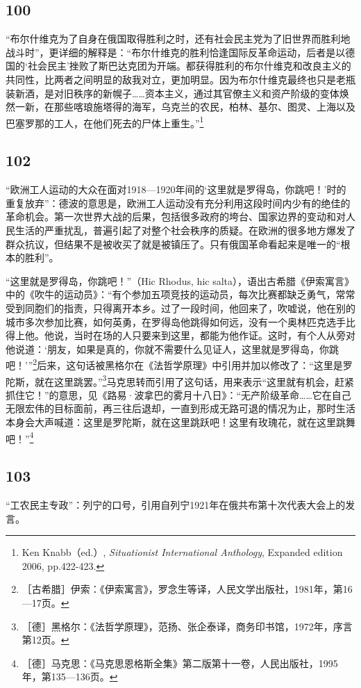\documentclass[fontset=fandol, a4paper, 12pt, openright]{ctexbook}
\begin{document}
\subsection*{100}
“布尔什维克为了自身在俄国取得胜利之时，还有社会民主党为了旧世界而胜利地战斗时”，更详细的解释是：“布尔什维克的胜利恰逢国际反革命运动，后者是以德国的‘社会民主’挫败了斯巴达克团为开端。都获得胜利的布尔什维克和改良主义的共同性，比两者之间明显的敌我对立，更加明显。因为布尔什维克最终也只是老瓶装新酒，是对旧秩序的新幌子……资本主义，通过其官僚主义和资产阶级的变体焕然一新，在那些喀琅施塔得的海军，乌克兰的农民，柏林、基尔、图灵、上海以及巴塞罗那的工人，在他们死去的尸体上重生。”\footnote{Ken Knabb（ed.）, \textit{Situationist International Anthology}, Expanded edition 2006, pp.422-423.}

\subsection*{102}
“欧洲工人运动的大众在面对1918—1920年间的‘这里就是罗得岛，你跳吧！’时的重复放弃”：德波的意思是，欧洲工人运动没有充分利用这段时间内少有的绝佳的革命机会。第一次世界大战的后果，包括很多政府的垮台、国家边界的变动和对人民生活的严重扰乱，普遍引起了对整个社会秩序的质疑。在欧洲的很多地方爆发了群众抗议，但结果不是被收买了就是被镇压了。只有俄国革命看起来是唯一的“根本的胜利”。

“这里就是罗得岛，你跳吧！”（Hic Rhodus, hic salta），语出古希腊《伊索寓言》中的《吹牛的运动员》：“有个参加五项竞技的运动员，每次比赛都缺乏勇气，常常受到同胞们的指责，只得离开本乡。过了一段时间，他回来了，吹嘘说，他在别的城市多次参加比赛，如何英勇，在罗得岛他跳得如何远，没有一个奥林匹克选手比得上他。他说，当时在场的人只要来到这里，都能为他作证。这时，有个人从旁对他说道：‘朋友，如果是真的，你就不需要什么见证人，这里就是罗得岛，你跳吧！’”\footnote{［古希腊］伊索：《伊索寓言》，罗念生等译，人民文学出版社，1981年，第16—17页。}后来，这句话被黑格尔在《法哲学原理》中引用并加以修改了：“这里是罗陀斯，就在这里跳罢。”\footnote{［德］黑格尔：《法哲学原理》，范扬、张企泰译，商务印书馆，1972年，序言第12页。}马克思转而引用了这句话，用来表示“这里就有机会，赶紧抓住它！”的意思，见《路易·波拿巴的雾月十八日》：“无产阶级革命……它在自己无限宏伟的目标面前，再三往后退却，一直到形成无路可退的情况为止，那时生活本身会大声喊道：这里是罗陀斯，就在这里跳跃吧！这里有玫瑰花，就在这里跳舞吧！”\footnote{［德］马克思：《马克思恩格斯全集》第二版第十一卷，人民出版社，1995年，第135—136页。}

\subsection*{103}
“工农民主专政”：列宁的口号，引用自列宁1921年在俄共布第十次代表大会上的发言。
\end{document}
